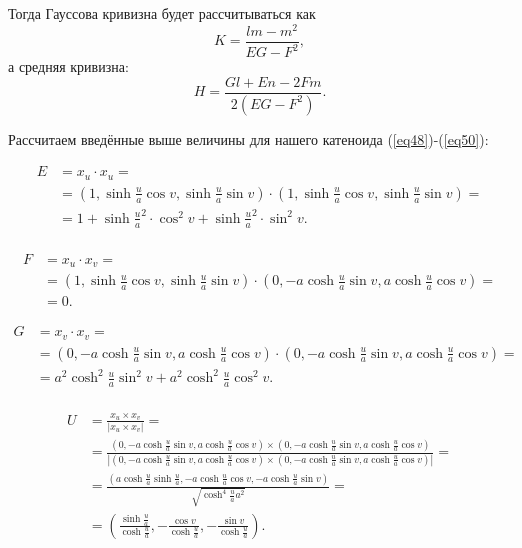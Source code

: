 \documentclass[14pt,a4paper]{extarticle}
\begin{document}
Тогда Гауссова кривизна будет рассчитываться как
\begin{equation}\label{eq58}
	K = \frac{lm - m^2}{EG-F^2},
\end{equation}
а средняя кривизна:
\begin{equation}\label{eq59}
	H = \frac{Gl + En -2Fm}{2(EG-F^2)}.
\end{equation}

Рассчитаем введённые выше величины для нашего катеноида (\ref{eq48})-(\ref{eq50}):

\begin{equation}\label{eq60}
\begin{split}
	E &= x_u \cdot x_u = \\
	&= (1, \sinh{\frac{u}{a}} \cos{v}, \sinh{\frac{u}{a}} \sin{v}) \cdot (1, \sinh{\frac{u}{a}} \cos{v}, \sinh{\frac{u}{a}} \sin{v})  = \\
	&= 1+\sinh{\frac{u}{a}}^2\cdot\cos^2{v}+\sinh{\frac{u}{a}}^2\cdot\sin^2{v}. \\
\end{split}
\end{equation}

\begin{equation}\label{eq61}
\begin{split}
	F &= x_u \cdot x_v = \\
	&= (1, \sinh{\frac{u}{a}} \cos{v}, \sinh{\frac{u}{a}} \sin{v}) \cdot (0, -a\cosh{\frac{u}{a}} \sin{v}, a\cosh{\frac{u}{a}} \cos{v})=\\
	&= 0. 
\end{split}
\end{equation}

\begin{equation}\label{eq62}
\begin{split}
	G &= x_v \cdot x_v = \\
	&= (0, -a\cosh{\frac{u}{a}} \sin{v}, a\cosh{\frac{u}{a}} \cos{v}) \cdot (0, -a\cosh{\frac{u}{a}} \sin{v}, a\cosh{\frac{u}{a}} \cos{v})  = \\	&= a^2 \cosh^2{\frac{u}{a}} \sin^2{v} + a^2 \cosh^2{\frac{u}{a}} \cos^2{v}.\\
\end{split}
\end{equation}


\begin{equation}\label{eq63}
\begin{split}
	U &= \frac{x_u \times x_v}{|x_u \times x_v|} = \\
	&= \frac{(0, -a\cosh{\frac{u}{a}} \sin{v}, a\cosh{\frac{u}{a}} \cos{v}) \times (0, -a\cosh{\frac{u}{a}} \sin{v}, a\cosh{\frac{u}{a}} \cos{v}) }{|(0, -a\cosh{\frac{u}{a}} \sin{v}, a\cosh{\frac{u}{a}} \cos{v}) \times (0, -a\cosh{\frac{u}{a}} \sin{v}, a\cosh{\frac{u}{a}} \cos{v})|} = \\
	&= \frac{(a\cosh{\frac{u}{a}}\sinh{\frac{u}{a}}, -a \cosh{\frac{u}{a}}\cos{v}, -a \cosh{\frac{u}{a}} \sin{v})}{\sqrt{\cosh^4{\frac{u}{a}}a^2}} = \\
	&= (\frac{\sinh{\frac{u}{a}}}{\cosh{\frac{u}{a}}},-\frac{\cos{v}}{\cosh{\frac{u}{a}}} ,-\frac{\sin{v}}{\cosh{\frac{u}{a}}}).
\end{split}
\end{equation}
\end{document}
